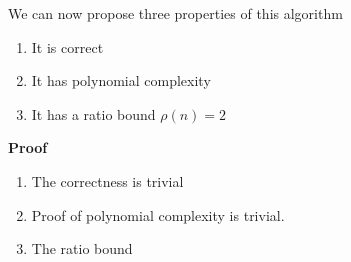 We can now propose three properties of this algorithm
\begin{enumerate}
    \item It is correct
    \item It has polynomial complexity
    \item It has a ratio bound $\rho(n) = 2$
\end{enumerate}
\textbf{Proof}
\begin{enumerate}
    \item
        The correctness is trivial
    \item
        Proof of polynomial complexity is trivial.
    \item
        The ratio bound
\end{enumerate}

